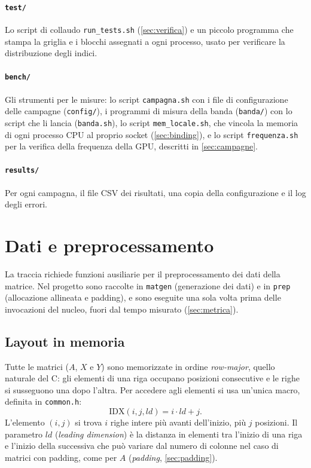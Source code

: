 \documentclass[11pt,a4paper]{article}
\begin{document}
\paragraph{\texttt{test/}} Lo script di collaudo \texttt{run\_tests.sh}
(\cref{sec:verifica}) e un piccolo programma che stampa la griglia e i blocchi
assegnati a ogni processo, usato per verificare la distribuzione degli indici.

\paragraph{\texttt{bench/}} Gli strumenti per le misure: lo script
\texttt{campagna.sh} con i file di configurazione delle campagne
(\texttt{config/}), i programmi di misura della banda (\texttt{banda/}) con
lo script che li lancia (\texttt{banda.sh}), lo script \texttt{mem\_locale.sh},
che vincola la memoria di ogni processo CPU al proprio socket
(\cref{sec:binding}), e lo script \texttt{frequenza.sh} per la verifica
della frequenza della GPU, descritti in \cref{sec:campagne}.

\paragraph{\texttt{results/}} Per ogni campagna, il file CSV dei risultati,
una copia della configurazione e il log degli errori.

\section{Dati e preprocessamento}\label{sec:dati}

La traccia richiede funzioni ausiliarie per il preprocessamento dei dati della
matrice. Nel progetto sono raccolte in \texttt{matgen} (generazione dei dati) e
in \texttt{prep} (allocazione allineata e padding), e sono eseguite una sola
volta prima delle invocazioni del nucleo, fuori dal tempo misurato
(\cref{sec:metrica}).

\subsection{Layout in memoria}\label{sec:layout}

Tutte le matrici ($A$, $X$ e $Y$) sono memorizzate in ordine
\emph{row-major}, quello naturale del C: gli elementi di una riga occupano
posizioni consecutive e le righe si susseguono una dopo l'altra. Per accedere
agli elementi si usa un'unica macro, definita in \texttt{common.h}:
\[
  \mathrm{IDX}(i, j, \mathit{ld}) = i \cdot \mathit{ld} + j .
\]
L'elemento $(i, j)$ si trova $i$ righe intere più avanti dell'inizio, più $j$
posizioni. Il parametro $\mathit{ld}$ (\emph{leading dimension}) è la distanza
in elementi tra l'inizio di una riga e l'inizio della successiva che può variare
dal numero di colonne nel caso di matrici con padding, come per $A$ (\emph{padding},
\cref{sec:padding}).
\end{document}
